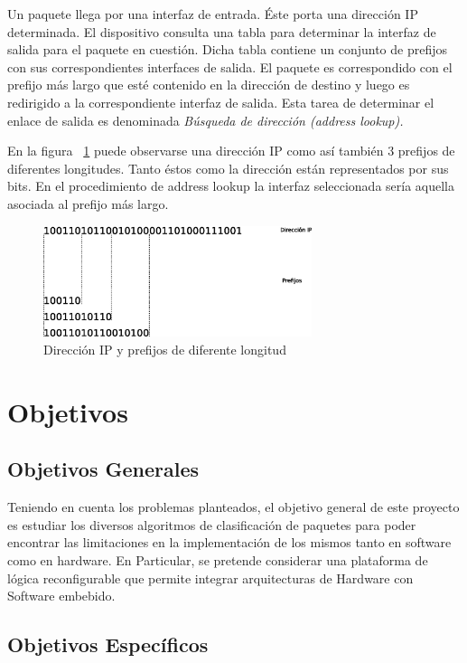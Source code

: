 Un paquete llega por una interfaz de entrada. Éste porta una dirección IP determinada. El dispositivo consulta una tabla para determinar la interfaz de salida para el paquete en cuestión. Dicha tabla contiene un conjunto de prefijos con sus correspondientes interfaces de salida. El paquete es correspondido con el prefijo más largo que esté contenido en la dirección de destino y luego es redirigido  a la correspondiente interfaz de salida. Esta tarea de determinar el enlace de salida es denominada \textit{Búsqueda de dirección (address lookup).}

En la figura ~\ref{fig:prefijos} puede observarse una dirección IP como así también 3 prefijos de diferentes longitudes. Tanto éstos como la dirección están representados por sus bits. En el procedimiento de address lookup la interfaz seleccionada sería aquella asociada al prefijo más largo.

 \begin{figure}[h]
  \centering
	 \includegraphics[width=0.7\textwidth]{1-introduccion/graf/prefijos.eps}
  \caption{Dirección IP y prefijos de diferente longitud}
  \label{fig:prefijos}
\end{figure}



\section{Objetivos}
\subsection{Objetivos Generales}
Teniendo en cuenta los problemas planteados, el objetivo general de este proyecto es estudiar los diversos algoritmos de clasificación de paquetes para poder encontrar las limitaciones en la implementación de los mismos tanto en software como en hardware. 
En Particular, se pretende considerar una plataforma de lógica reconfigurable que permite integrar arquitecturas de Hardware con Software embebido.

\subsection{Objetivos Específicos}

